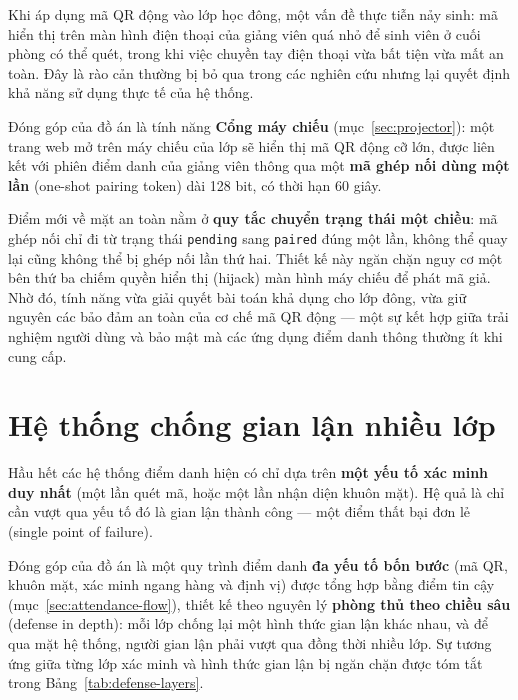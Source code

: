 \documentclass[../main.tex]{subfiles}
\begin{document}
Khi áp dụng mã QR động vào lớp học đông, một vấn đề thực tiễn nảy sinh: mã hiển thị trên màn
hình điện thoại của giảng viên quá nhỏ để sinh viên ở cuối phòng có thể quét, trong khi việc
chuyền tay điện thoại vừa bất tiện vừa mất an toàn. Đây là rào cản thường bị bỏ qua trong các
nghiên cứu nhưng lại quyết định khả năng sử dụng thực tế của hệ thống.

Đóng góp của đồ án là tính năng \textbf{Cổng máy chiếu} (mục~\ref{sec:projector}): một trang
web mở trên máy chiếu của lớp sẽ hiển thị mã QR động cỡ lớn, được liên kết với phiên điểm danh
của giảng viên thông qua một \textbf{mã ghép nối dùng một lần} (one-shot pairing token) dài
128 bit, có thời hạn 60 giây.

Điểm mới về mặt an toàn nằm ở \textbf{quy tắc chuyển trạng thái một chiều}: mã ghép nối chỉ đi
từ trạng thái \texttt{pending} sang \texttt{paired} đúng một lần, không thể quay lại cũng
không thể bị ghép nối lần thứ hai. Thiết kế này ngăn chặn nguy cơ một bên thứ ba chiếm quyền
hiển thị (hijack) màn hình máy chiếu để phát mã giả. Nhờ đó, tính năng vừa giải quyết bài toán
khả dụng cho lớp đông, vừa giữ nguyên các bảo đảm an toàn của cơ chế mã QR động --- một sự kết
hợp giữa trải nghiệm người dùng và bảo mật mà các ứng dụng điểm danh thông thường ít khi cung
cấp.

\section{Hệ thống chống gian lận nhiều lớp}
\label{sec:dg-fraud}

Hầu hết các hệ thống điểm danh hiện có chỉ dựa trên \textbf{một yếu tố xác minh duy nhất} (một
lần quét mã, hoặc một lần nhận diện khuôn mặt). Hệ quả là chỉ cần vượt qua yếu tố đó là gian
lận thành công --- một điểm thất bại đơn lẻ (single point of failure).

Đóng góp của đồ án là một quy trình điểm danh \textbf{đa yếu tố bốn bước} (mã QR, khuôn mặt,
xác minh ngang hàng và định vị) được tổng hợp bằng điểm tin cậy
(mục~\ref{sec:attendance-flow}), thiết kế theo nguyên lý \textbf{phòng thủ theo chiều sâu}
(defense in depth): mỗi lớp chống lại một hình thức gian lận khác nhau, và để qua mặt hệ thống,
người gian lận phải vượt qua đồng thời nhiều lớp. Sự tương ứng giữa từng lớp xác minh và hình
thức gian lận bị ngăn chặn được tóm tắt trong Bảng~\ref{tab:defense-layers}.
\end{document}
